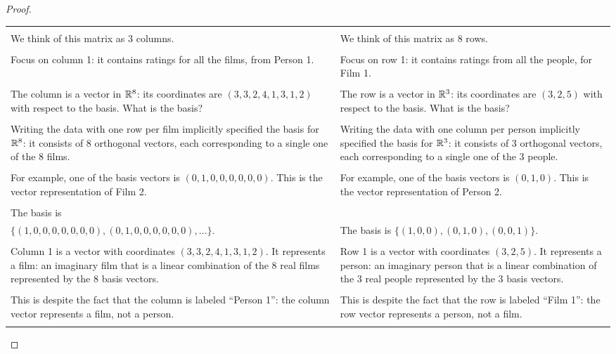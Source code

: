 \begin{proof}
\begin{tabular}{|p{8cm}|p{8 cm}|}
  \hline
  &\\
  We think of this matrix as 3 columns.
  &We think of this matrix as 8 rows.\\
  &\\

  Focus on column 1: it contains ratings for all the films, from Person 1.
  &Focus on row 1: it contains ratings from all the people, for Film 1.\\
  &\\

  The column is a vector in $\mathbb{R}^8$: its coordinates are $(3,3,2,4,1,3,1,2)$ with respect to the basis. What is the
  basis?
  &The row is a vector in $\mathbb{R}^3$: its coordinates are $(3, 2, 5)$ with respect to the basis. What is the
    basis?\\
  &\\

  Writing the data with one row per film implicitly specified the basis for $\mathbb{R}^8$:
  it consists of 8 orthogonal vectors, each corresponding to a single one of the 8 films.
  &Writing the data with one column per person implicitly specified the basis for $\mathbb{R}^3$:
    it consists of 3 orthogonal vectors, each corresponding to a single one of the 3 people.\\
  &\\

  For example, one of the basis vectors is $(0, 1, 0, 0, 0, 0, 0, 0)$. This is the
  vector representation of Film 2.
  &For example, one of the basis vectors is $(0, 1, 0)$. This is the vector
    representation of Person 2.\\
  &\\

  The basis is\\ $\{(1, 0, 0, 0, 0, 0, 0, 0), (0, 1, 0, 0, 0, 0, 0, 0), \ldots\}$.
  &The basis is $\{(1, 0, 0), (0, 1, 0), (0, 0, 1)\}$.\\
  &\\

  Column 1 is a vector with coordinates $(3,3,2,4,1,3,1,2)$.
  It represents a film: an imaginary film that is a linear combination of the 8 real
  films represented by the 8 basis vectors.
  &Row 1 is a vector with coordinates $(3, 2, 5)$.
    It represents a person: an imaginary person that is a linear combination of the 3 real
    people represented by the 3 basis vectors.\\
  &\\

  This is despite the fact that the column is labeled ``Person 1'': the column vector represents a film, not a person.
  &This is despite the fact that the row is labeled ``Film 1'': the row vector represents a person, not a film.\\
  &\\


\end{tabular}
\end{proof}
